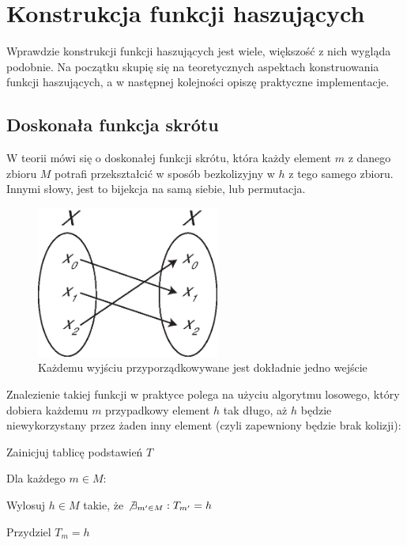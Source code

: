 \documentclass[12pt,a4paper,twoside]{article}
\begin{document}
\section{Konstrukcja funkcji haszujących}
\label{sec:hash_construction}
Wprawdzie konstrukcji funkcji haszujących jest wiele, większość z nich wygląda
podobnie. Na początku skupię się na teoretycznych aspektach konstruowania
funkcji haszujących, a w następnej kolejności opiszę praktyczne implementacje.



\subsection{Doskonała funkcja skrótu}
W teorii mówi się o doskonałej funkcji skrótu, która każdy element $m$ z danego
zbioru $M$ potrafi przekształcić w sposób bezkolizyjny w $h$ z tego samego
zbioru. Innymi słowy, jest to bijekcja na samą siebie, lub permutacja.

\begin{figure}[htb!]
\includegraphics[width=6cm]{img/injection_self.eps}
\caption{Każdemu wyjściu przyporządkowywane jest dokładnie jedno wejście}
\label{fig:surjection}
\end{figure}


Znalezienie takiej funkcji w praktyce polega na użyciu algorytmu losowego,
który dobiera każdemu $m$ przypadkowy element $h$ tak długo, aż $h$ będzie
niewykorzystany przez żaden inny element (czyli zapewniony będzie brak
kolizji):

\begin{myenumerate}
\item Zainicjuj tablicę podstawień $T$
\item Dla każdego $m \in M$:
    \begin{myenumerate}
        \item Wylosuj $h \in M$ takie, że $\not \exists_{m' \in M} : T_{m'} = h$
        \item Przydziel $T_m = h$
    \end{myenumerate}
\end{myenumerate}
\end{document}
